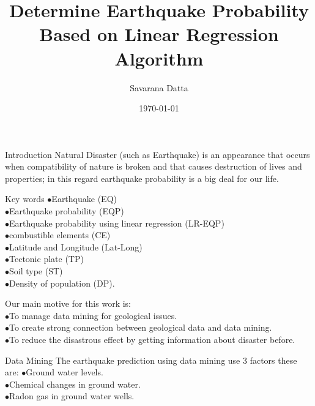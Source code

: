 \documentclass{beamer}
\title{Determine Earthquake Probability Based on Linear Regression Algorithm}
\author{Savarana Datta }
\institute{AI20BTECH11008}
\date{\today}
\begin{document}
\begin{frame}{}
 \titlepage 
\end{frame}
\begin{frame}{Introduction}
Natural Disaster (such as Earthquake) is an appearance that occurs when compatibility of nature is broken and that causes destruction of lives and properties; in this regard earthquake probability is a big deal for our life.
\end{frame}

\begin{frame}{Key words}
$\bullet$Earthquake (EQ)\\
$\bullet$Earthquake probability (EQP)\\
$\bullet$Earthquake probability using linear regression (LR-EQP)\\
$\bullet$combustible elements (CE)\\
$\bullet$Latitude and Longitude (Lat-Long)\\
$\bullet$Tectonic plate (TP)\\
$\bullet$Soil type (ST)\\
$\bullet$Density of population (DP).
\end{frame}

\begin{frame}{}
Our main motive for this work is:\\
$\bullet$To manage data mining for geological issues.\\
$\bullet$To create strong connection between geological data and data mining.\\
$\bullet$To reduce the disastrous effect by getting information about disaster before.
\end{frame}
\begin{frame}{Data Mining}
The earthquake prediction using data mining use 3 factors these are:
$\bullet$Ground water levels.\\
$\bullet$Chemical changes in ground water. \\
$\bullet$Radon gas in ground water wells.
\end{frame}
\end{document}
